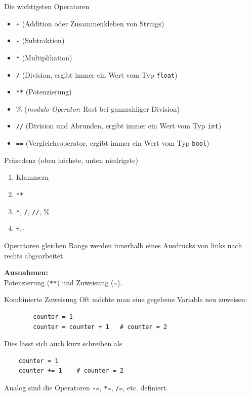 \documentclass[algorithm,pgfplots,colortheme=dark]{cuzbeamer}
\newcommand{\py}[1]{\texttt{#1}}
\newcommand{\pybw}[1]{\texttt{#1}}
\begin{document}
\begin{frame}
\begin{block}{Die wichtigsten Operatoren}
	\begin{itemize}
		\item \pybw{+} (Addition oder Zusammenkleben von Strings)
		\item \pybw{-} (Subtraktion)
		\item \pybw{*} (Multiplikation)
		\item \pybw{/} (Division, ergibt immer ein Wert vom Typ \pybw{float})
		\item \pybw{**} (Potenzierung)
			\item \% (\textit{modulo-Operator}: Rest bei ganzzahliger Division)
		\item \pybw{//} (Division und Abrunden, ergibt immer ein Wert vom Typ \pybw{int})
		\item \pybw{==} (Vergleichsoperator, ergibt immer ein Wert vom Typ \pybw{bool})
	\end{itemize}
\end{block}
\end{frame}

\begin{frame}
\begin{block}{Präzedenz (oben höchste, unten niedrigste)}
	\begin{enumerate}
		\item Klammern
		\item \pybw{**}
		\item \pybw{*}, \pybw{/}, \pybw{//}, \%
		\item \pybw{+},\pybw{-}
	\end{enumerate}	
Operatoren gleichen Rangs werden innerhalb eines Ausdrucks von links nach rechts abgearbeitet. 

\vspace{10pt}
\textbf{Ausnahmen:}\\
Potenzierung (\py{**}) und Zuweisung (\py{=}). 
\end{block}
\end{frame}

\begin{fragile}[]
	\begin{block}{Kombinierte Zuweisung}
		\vspace{2pt}
		Oft möchte man eine gegebene Variable neu zuweisen: 
		\begin{verbatim}
		counter = 1
		counter = counter + 1 	# counter = 2
		\end{verbatim}
	Dies lässt sich auch kurz schreiben als 
		\begin{verbatim}
	counter = 1
	counter += 1 	# counter = 2
	\end{verbatim}
	Analog sind die Operatoren \py{-=}, \py{*=}, \py{/=}, etc. definiert. 
	\end{block}
	
	
	\end{fragile}
\end{document}
